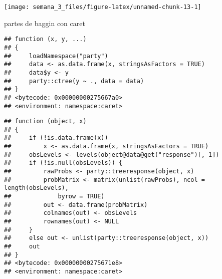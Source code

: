 \documentclass[
]{article}
\newenvironment{Shaded}{\begin{snugshade}}{\end{snugshade}}
\newcommand{\NormalTok}[1]{#1}
\newcommand{\SpecialCharTok}[1]{\textcolor[rgb]{0.00,0.00,0.00}{#1}}
\begin{document}
\begin{center}\texttt{[image: semana\_3\_files/figure-latex/unnamed-chunk-13-1]} \end{center}

partes de baggin con caret

\begin{Shaded}
\end{Shaded}

\begin{verbatim}
## function (x, y, ...) 
## {
##     loadNamespace("party")
##     data <- as.data.frame(x, stringsAsFactors = TRUE)
##     data$y <- y
##     party::ctree(y ~ ., data = data)
## }
## <bytecode: 0x00000000275667a0>
## <environment: namespace:caret>
\end{verbatim}

\begin{Shaded}
\end{Shaded}

\begin{verbatim}
## function (object, x) 
## {
##     if (!is.data.frame(x)) 
##         x <- as.data.frame(x, stringsAsFactors = TRUE)
##     obsLevels <- levels(object@data@get("response")[, 1])
##     if (!is.null(obsLevels)) {
##         rawProbs <- party::treeresponse(object, x)
##         probMatrix <- matrix(unlist(rawProbs), ncol = length(obsLevels), 
##             byrow = TRUE)
##         out <- data.frame(probMatrix)
##         colnames(out) <- obsLevels
##         rownames(out) <- NULL
##     }
##     else out <- unlist(party::treeresponse(object, x))
##     out
## }
## <bytecode: 0x00000000275671e8>
## <environment: namespace:caret>
\end{verbatim}

\begin{Shaded}
\end{Shaded}
\end{document}
